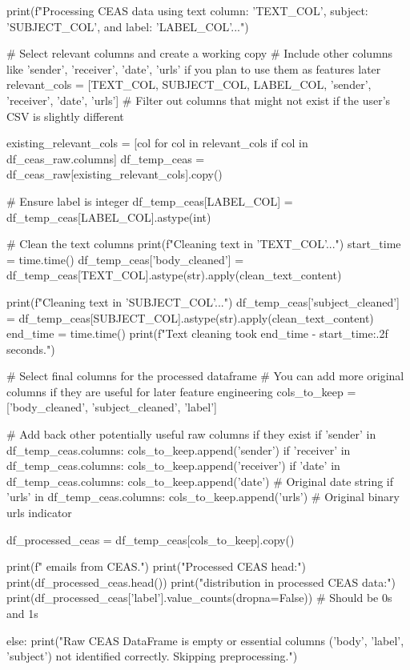 \begin{ffcode}
    print(f"Processing CEAS data using text column: '{TEXT_COL}', subject: '{SUBJECT_COL}', and label: '{LABEL_COL}'...")

    # Select relevant columns and create a working copy
    # Include other columns like 'sender', 'receiver', 'date', 'urls' if you plan to use them as features later
    relevant_cols = [TEXT_COL, SUBJECT_COL, LABEL_COL, 'sender', 'receiver', 'date', 'urls']
    # Filter out columns that might not exist if the user's CSV is slightly different

    existing_relevant_cols = [col for col in relevant_cols if col in df_ceas_raw.columns]
    df_temp_ceas = df_ceas_raw[existing_relevant_cols].copy()

    # Ensure label is integer
    df_temp_ceas[LABEL_COL] = df_temp_ceas[LABEL_COL].astype(int)

    # Clean the text columns
    print(f"Cleaning text in '{TEXT_COL}'...")
    start_time = time.time()
    df_temp_ceas['body_cleaned'] = df_temp_ceas[TEXT_COL].astype(str).apply(clean_text_content)

    print(f"Cleaning text in '{SUBJECT_COL}'...")
    df_temp_ceas['subject_cleaned'] = df_temp_ceas[SUBJECT_COL].astype(str).apply(clean_text_content)
    end_time = time.time()
    print(f"Text cleaning took {end_time - start_time:.2f} seconds.")

    # Select final columns for the processed dataframe
    # You can add more original columns if they are useful for later feature engineering
    cols_to_keep = ['body_cleaned', 'subject_cleaned', 'label']

    # Add back other potentially useful raw columns if they exist
    if 'sender' in df_temp_ceas.columns: cols_to_keep.append('sender')
    if 'receiver' in df_temp_ceas.columns: cols_to_keep.append('receiver')
    if 'date' in df_temp_ceas.columns: cols_to_keep.append('date') # Original date string
    if 'urls' in df_temp_ceas.columns: cols_to_keep.append('urls') # Original binary urls indicator

    df_processed_ceas = df_temp_ceas[cols_to_keep].copy()

    print(f" emails from CEAS.")
    print("Processed CEAS head:")
    print(df_processed_ceas.head())
    print("\nLabel distribution in processed CEAS data:")
    print(df_processed_ceas['label'].value_counts(dropna=False)) # Should be 0s and 1s

else:
    print("Raw CEAS DataFrame is empty or essential columns ('body', 'label', 'subject') not identified correctly. Skipping preprocessing.")


\end{ffcode}
